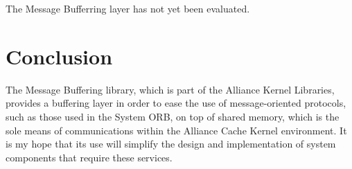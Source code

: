 \documentclass[]{article}
\begin{document}
The Message Bufferring layer has not yet been evaluated.

\section{Conclusion}

The Message Buffering library, which is part of the Alliance Kernel
Libraries, provides a buffering layer in order to ease the use of
message-oriented protocols, such as those used in the System ORB, on top
of shared memory, which is the sole means of communications within the
Alliance Cache Kernel environment.  It is my hope that its use will
simplify the design and implementation of system components that require
these services.
\end{document}
